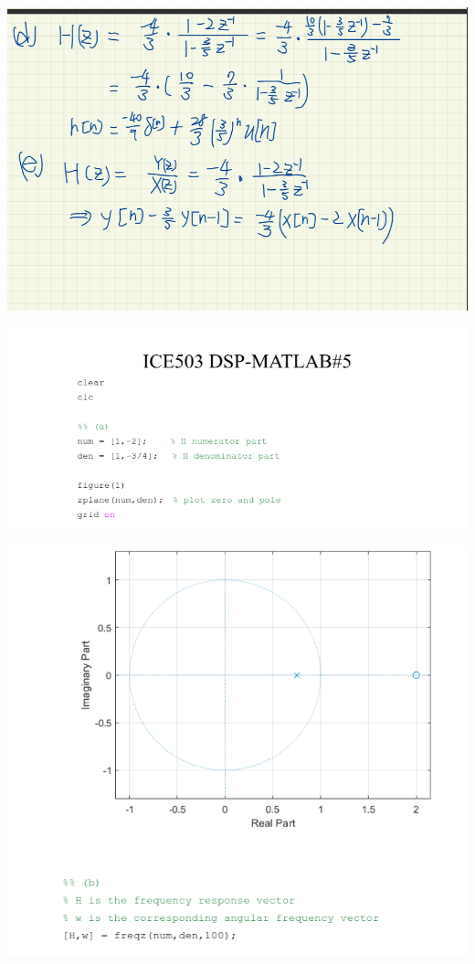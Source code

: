 \documentclass[a4paper]{article}
\begin{document}
	\begin{center}
		\includegraphics[width=1\linewidth]{screenshot049}
	\end{center}
	\begin{center}
		\includegraphics[width=1\linewidth]{screenshot050}
	\end{center}
	\begin{center}
		\includegraphics[width=1\linewidth]{screenshot051}
	\end{center}
\end{document}
